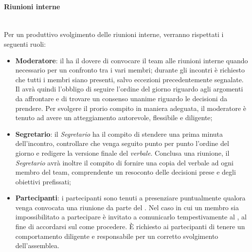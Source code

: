 \paragraph{Riunioni interne}
~\\Per un produttivo svolgimento delle riunioni interne, verranno rispettati i seguenti ruoli:
\begin{itemize}
\item\textbf{Moderatore}: il \RdP{} ha il dovere di convocare il team alle riunioni interne quando necessario per un confronto tra i vari membri;
durante gli incontri è richiesto che tutti i membri siano presenti, salvo eccezioni precedentemente segnalate.
Il \RdP{} avrà quindi l'obbligo di seguire l'ordine del giorno riguardo agli argomenti da affrontare 
e di trovare un consenso unanime riguardo le decisioni da prendere.
Per svolgere il prorio compito in maniera adeguata, il moderatore è tenuto ad avere un atteggiamento autorevole, flessibile
e diligente;
\item\textbf{Segretario}: il \emph{Segretario} ha il compito di stendere una prima minuta dell'incontro, controllare che venga seguito punto per punto l'ordine del giorno e redigere la versione finale del \emph{verbale}.
Conclusa una riunione, il \emph{Segretario} avrà inoltre il compito di fornire una copia del verbale ad ogni membro del team,
comprendente un resoconto delle decisioni prese e degli obiettivi prefissati;
\item\textbf{Partecipanti}: i partecipanti sono tenuti a presenziare puntualmente qualora venga convocata una riunione da parte del \RdP{}. Nel caso in cui un membro sia impossibilitato a partecipare è invitato
a comunicarlo tempestivamente al \RdP, al fine di accordarsi sul come procedere. È richiesto ai partecipanti di
tenere un comportamento diligente e responsabile per un corretto svolgimento dell'assemblea.
\end{itemize}

